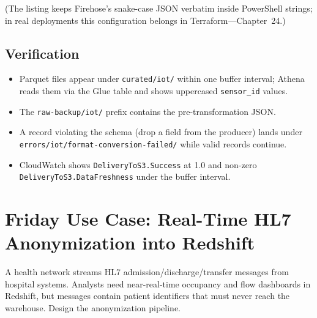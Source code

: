 (The listing keeps Firehose's snake-case JSON verbatim inside PowerShell strings; in real deployments this configuration belongs in Terraform---Chapter~24.)

\subsection*{Verification}
\begin{itemize}
    \item Parquet files appear under \texttt{curated/iot/} within one buffer interval; Athena reads them via the Glue table and shows uppercased \texttt{sensor\_id} values.
    \item The \texttt{raw-backup/iot/} prefix contains the pre-transformation JSON.
    \item A record violating the schema (drop a field from the producer) lands under \texttt{errors/iot/format-conversion-failed/} while valid records continue.
    \item CloudWatch shows \texttt{DeliveryToS3.Success} at 1.0 and non-zero \texttt{DeliveryToS3.DataFreshness} under the buffer interval.
\end{itemize}

\section{Friday Use Case: Real-Time HL7 Anonymization into Redshift}
A health network streams HL7 admission/discharge/transfer messages from hospital systems. Analysts need near-real-time occupancy and flow dashboards in Redshift, but messages contain patient identifiers that must never reach the warehouse. Design the anonymization pipeline.

